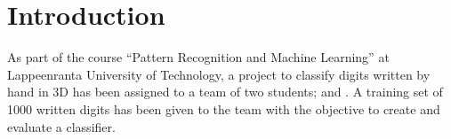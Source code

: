 \documentclass[report.tex]{subfile}
\begin{document}
\vfill

\section{Introduction}
As part of the course ``Pattern Recognition and Machine Learning'' at
Lappeenranta University of Technology, a project to classify digits written by
hand in 3D has been assigned to a team of two students; \authorA{} and
\authorB{}. A training set of 1000 written digits has been given to the team
with the objective to create and evaluate a classifier.

\vfill
\end{document}
